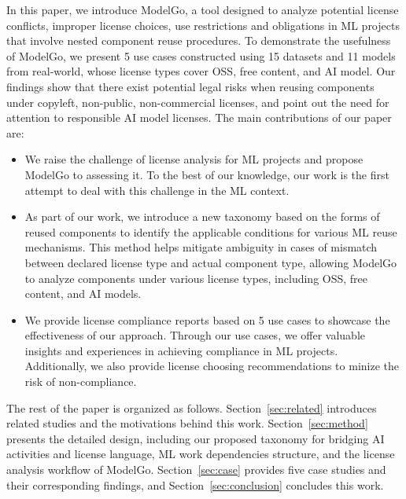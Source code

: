 In this paper, we introduce ModelGo, a tool designed to analyze potential license conflicts, improper license choices, use restrictions and obligations in ML projects that involve nested component reuse procedures.
To demonstrate the usefulness of ModelGo, we present 5 use cases constructed using 15 datasets and 11 models from real-world, whose license types cover OSS, free content, and AI model.
Our findings show that there exist potential legal risks when reusing  components under copyleft, non-public, non-commercial licenses, and point out the need for attention to responsible AI model licenses.
The main contributions of our paper are:
\begin{itemize}[]
    \item We raise the challenge of license analysis for ML projects and propose ModelGo to assessing it. To the best of our knowledge, our work is the first attempt to deal with this challenge in the ML context.
    \item As part of our work, we introduce a new taxonomy based on the forms of reused components to identify the applicable conditions for various ML reuse mechanisms. This method helps mitigate ambiguity in cases of mismatch between declared license type and actual component type, allowing ModelGo to analyze components under various license types, including OSS, free content, and AI models.
    \item  We provide license compliance reports based on 5 use cases to showcase the effectiveness of our approach. 
    Through our use cases, we offer valuable insights and experiences in achieving compliance in ML projects. 
    Additionally, we also provide license choosing recommendations to minize the risk of non-compliance.
\end{itemize}

The rest of the paper is organized as follows.
Section~\ref{sec:related} introduces related studies and the motivations behind this work.
Section~\ref{sec:method} presents the detailed design, including our proposed taxonomy for bridging AI activities and license language, ML work dependencies structure, and the license analysis workflow of ModelGo.
Section~\ref{sec:case} provides five case studies and their corresponding findings, and Section~\ref{sec:conclusion} concludes this work.

